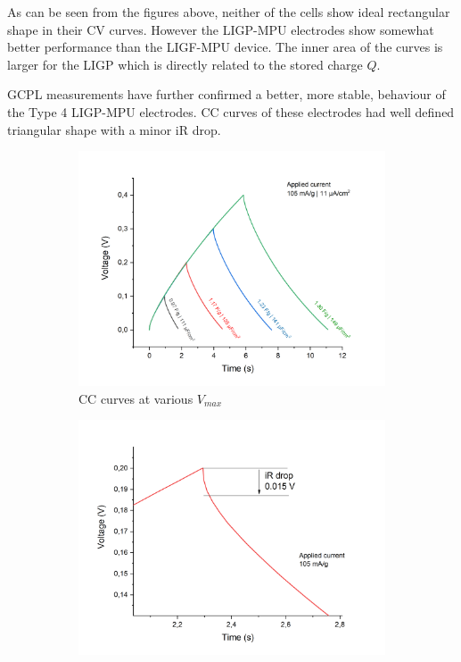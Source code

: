 As can be seen from the figures above, neither of the cells show ideal rectangular shape in their CV curves. However the LIGP-MPU electrodes show somewhat better performance than the LIGF-MPU device. The inner area of the curves is larger for the LIGP which is directly related to the stored charge $Q$.

GCPL measurements have further confirmed a better, more stable, behaviour of the Type 4 LIGP-MPU electrodes. CC curves of these electrodes had well defined triangular shape with a minor iR drop. 

\begin{figure}[H]
\begin{subfigure}{0.49\textwidth}
\includegraphics[width=1\textwidth]{Figures/Results/Electrochemistry/LIGP-MPU-NaNO3-Swagelok/Cell1/GCPL_130mA-g.jpg} 
\captionsetup{width=0.9\linewidth}
\caption{CC curves at various $V_{max}$}
\label{fig:LIGP-MPU-cell1-CC}
\end{subfigure}
\begin{subfigure}{0.49\textwidth}
\includegraphics[width=1\textwidth]{Figures/Results/Electrochemistry/LIGP-MPU-NaNO3-Swagelok/Cell1/iR-drop.jpg}

\end{subfigure}
\end{figure}
